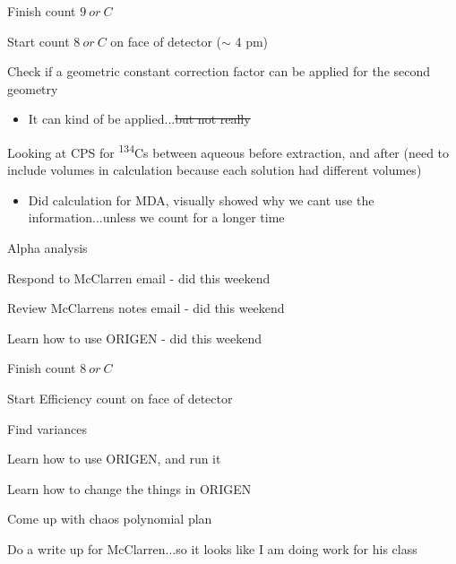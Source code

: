 \documentclass[idxtotoc,hyperref,openany,oneside]{labbook} %
\newcommand{\cmark}{\ding{51}}%
\newcommand{\done}{\rlap{$\square$}{\raisebox{2pt}{\large\hspace{1pt}\cmark}}%
  \hspace{-2.5pt}}
\newcommand{\tss}{\textsuperscript}
\begin{document}
\begin{todolist}
\item[\done]{Finish count $\boxed{9\ or\ C}$}
\item[\done]{Start count $\boxed{8\ or\ C}$ on face of detector ($\sim$ 4 pm)}
\item[\done]{Check if a geometric constant correction factor
  can be applied for the second geometry}
  \begin{itemize}
  \item{It can kind of be applied...\st{but not really}}
  \end{itemize}
\item[\done]{Looking at CPS for \tss{134}Cs between aqueous
  before extraction, and after (need to include volumes in
  calculation because each solution had different volumes)}
  \begin{itemize}
  \item{Did calculation for MDA, visually showed why
    we cant use the information...unless we count for a longer time}
  \end{itemize}
\end{todolist}


\begin{todolist}
\item{Alpha analysis}
\item{Respond to McClarren email - did this weekend}
\item{Review McClarrens notes email - did this weekend}
\item{Learn how to use ORIGEN - did this weekend}
\end{todolist}




\begin{todolist}
\item[\done]{Finish count $\boxed{8\ or\ C}$}
\item[\done]{Start Efficiency count on face of detector}
\end{todolist}

\begin{todolist}
\item{Find variances}
\item[\done]{Learn how to use ORIGEN, and run it}
\item[\done]{Learn how to change the things in ORIGEN}
\item{Come up with chaos polynomial plan}
\item[\done]{Do a write up for McClarren...so it looks like
  I am doing work for his class}
\end{todolist}
\end{document}
